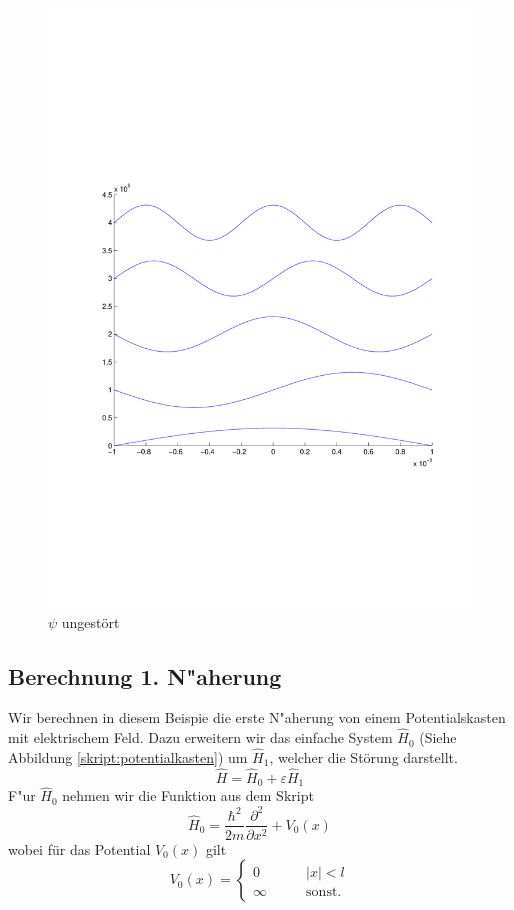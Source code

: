 \begin{refsection}
\begin{figure}
 \centering
 \includegraphics[width=12cm,clip=true,trim=2cm 7cm 1cm 8cm]{efeld/Psi_ungestoert.pdf}
 \caption{$\psi$ ungest\"ort}
 \label{abb:efeld_psi_ungestoert}
\end{figure}








\subsection{ Berechnung 1. N"aherung }


Wir berechnen in diesem Beispie die erste N"aherung von einem Potentialskasten mit elektrischem Feld.
Dazu erweitern wir das einfache System  $\hat H_0$
(Siehe Abbildung \ref{skript:potentialkasten})
um $\hat H_1$, welcher die Störung darstellt.
\[
  \hat{H} = \hat H_0 + \varepsilon \hat H_1
\]
F"ur $\hat H_0$ nehmen wir die Funktion aus dem Skript
\[
  \hat H_0 = \frac{\hbar^2}{2m} \frac{\partial^2}{\partial x^2} + V_0(x)
\]
wobei f\"ur das Potential $V_0(x)$ gilt
\[
  V_0(x)=\begin{cases}
    0       & \qquad |x|<l\\
    \infty  & \qquad\text{sonst.}
  \end{cases}
\]


\end{refsection}
